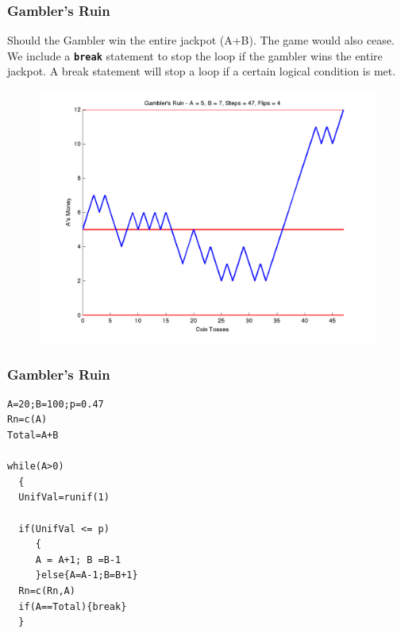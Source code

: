 \documentclass[MAIN.tex]{subfiles}
\begin{document}
\begin{frame}
	\frametitle{Gambler's Ruin}
Should the Gambler win the entire jackpot (A+B). The game would also cease. We include a \textbf{\texttt{break}} statement to stop the loop if the gambler wins the entire jackpot. A break statement will stop a loop if a certain logical condition is met.
\end{frame}

\begin{frame}
	\begin{figure}
\centering
\includegraphics[width=0.7\linewidth]{images/gamblerruinnew}
\caption{}
\label{fig:gamblerruinnew}
\end{figure}

\end{frame}

\begin{frame}[fragile]
	\frametitle{Gambler's Ruin}
\begin{framed}
\begin{verbatim}
A=20;B=100;p=0.47
Rn=c(A)
Total=A+B

while(A>0)
  {
  UnifVal=runif(1)

  if(UnifVal <= p)
     {
     A = A+1; B =B-1
     }else{A=A-1;B=B+1}
  Rn=c(Rn,A)
  if(A==Total){break}
  }
\end{verbatim}
\end{framed}
\end{frame}

\end{document}
